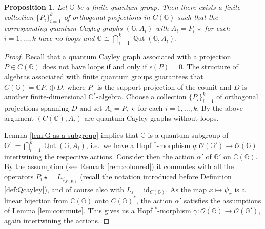 \documentclass[12pt]{amsart}
\newtheorem{prop}[thm]{Proposition}
\theoremstyle{definition}
\theoremstyle{definition}
\theoremstyle{definition}
\theoremstyle{definition}
\DeclareMathOperator{\Aut}{Aut}
\DeclareMathOperator{\Qut}{\mathbb{Q}ut}
\newcommand{\id}{\mathrm{id}}
\newcommand{\G}{\mathbb{G}}
\newcommand{\C}{\mathbb{C}}
\newcommand{\Gr}{\mathcal{G}}
\newcommand{\cO}{\mathcal{O}}
\newcommand{\Cst}{\textrm{C}^\ast}
\numberwithin{equation}{section}
\begin{document}
\begin{prop}
\label{P.quantum1}
    Let $\G$ be a finite quantum group. Then there exists a finite collection $\{P_i\}_{i=1}^k$ of orthogonal projections in $C(\G)$ such that  the corresponding quantum Cayley graphs $(\G, A_i)$ with $A_i = P_i\, \star$ for each $i=1, \ldots, k$ have no loops and $\G \cong \bigcap_{i=1}^k  \Qut(\G, A_i)$. 
\end{prop}
\begin{proof}
Recall that a quantum Cayley graph associated with a projection $P \in C(\G)$ does not have loops if and only if $\epsilon(P)=0$. The structure of algebras associated with finite quantum groups guarantees that $C(\G) = \C P_\epsilon \oplus D$, where $P_\epsilon$ is the support projection of the counit and $D$ is another finite-dimensional $\Cst$-algebra. Choose a collection $\{P_i\}_{i=1}^k$ of orthogonal projections spanning $D$ and set $A_i = P_i\, \star$ for each $i=1, \ldots,k$. By the above argument $(C(\G),A_i)$ are quantum Cayley graphs without loops.



Lemma \ref{lem:G as a subgroup} implies that $\G$ is a quantum subgroup of $\G':=  \bigcap_{i=1}^k  \Qut(\G, A_i)$, i.e.\ we have a Hopf $^*$-morphism  $q: \cO(\G') \to \cO(\G)$ intertwining the respective actions. Consider then the action $\alpha'$ of $\G'$ on $\C(\G)$. By the assumption (see Remark \ref{rem:coloured}) it commutes with all the operators $P_i \, \star = L_{\psi_{S(P_i)}}$ (recall the notation introduced before Definition \ref{def:Qcayley}), and of course also with $L_{\varepsilon} = \id_{C(\G)}$. As the map $x \mapsto \psi_x$ is a linear bijection from $\C(\G)$ onto $C(\G)^*$, the action $\alpha'$ satisfies the assumptions of Lemma \ref{lem:commute}. This gives us a Hopf $^*$-morphism $\gamma: \cO(\G) \to \cO(\G')$, again intertwining the actions. 

\end{proof}
\end{document}
